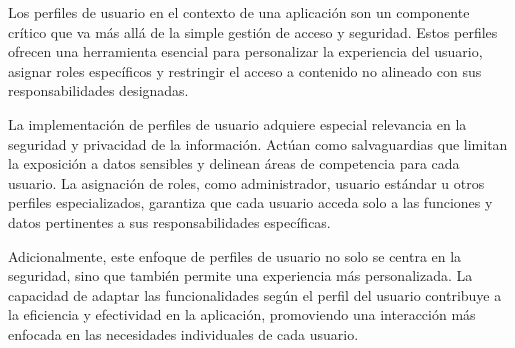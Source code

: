 Los perfiles de usuario en el contexto de una aplicación son un componente crítico que va más allá de la simple gestión de acceso y seguridad. Estos perfiles ofrecen una herramienta esencial para personalizar la experiencia del usuario, asignar roles específicos y restringir el acceso a contenido no alineado con sus responsabilidades designadas.

La implementación de perfiles de usuario adquiere especial relevancia en la seguridad y privacidad de la información. Actúan como salvaguardias que limitan la exposición a datos sensibles y delinean áreas de competencia para cada usuario. La asignación de roles, como administrador, usuario estándar u otros perfiles especializados, garantiza que cada usuario acceda solo a las funciones y datos pertinentes a sus responsabilidades específicas.

Adicionalmente, este enfoque de perfiles de usuario no solo se centra en la seguridad, sino que también permite una experiencia más personalizada. La capacidad de adaptar las funcionalidades según el perfil del usuario contribuye a la eficiencia y efectividad en la aplicación, promoviendo una interacción más enfocada en las necesidades individuales de cada usuario.